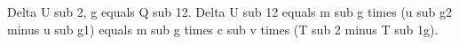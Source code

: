 Delta U sub 2, g equals Q sub 12.  
Delta U sub 12 equals m sub g times (u sub g2 minus u sub g1) equals m sub g times c sub v times (T sub 2 minus T sub 1g).
